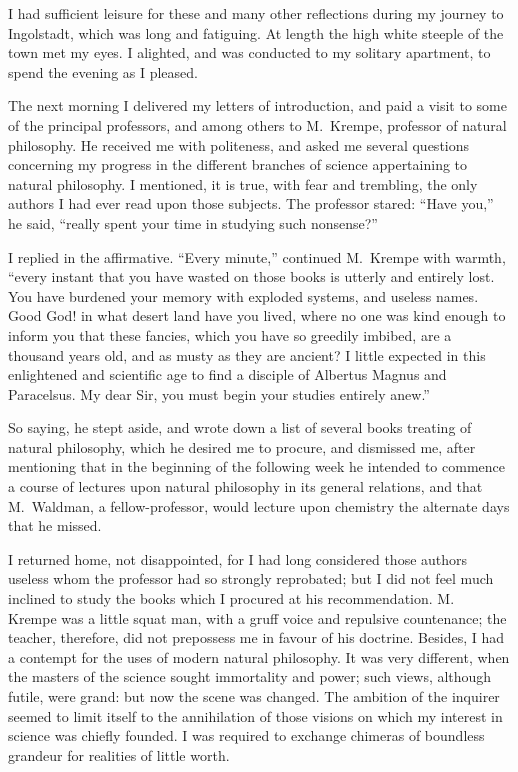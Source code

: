 I had sufficient leisure for these and
many other reflections during my journey
to Ingolstadt, which was long and
fatiguing. At length the high white
steeple of the town met my eyes. I
alighted, and was conducted to my solitary
apartment, to spend the evening
as I pleased.

The next morning I delivered my
letters of introduction, and paid a visit
to some of the principal professors, and
among others to M.~Krempe, professor
of natural philosophy. He received
me with politeness, and asked me several
questions concerning my progress
in the different branches of science
appertaining to natural philosophy. I
mentioned, it is true, with fear and
trembling, the only authors I had ever
read upon those subjects. The professor
stared: ``Have you,'' he said,
``really spent your time in studying
such nonsense?''

I replied in the affirmative. ``Every
minute,'' continued M.~Krempe with
warmth, ``every instant that you have
wasted on those books is utterly and
entirely lost. You have burdened your
memory with exploded systems, and
useless names. Good God! in what
desert land have you lived, where no
one was kind enough to inform you
that these fancies, which you have so
greedily imbibed, are a thousand years
old, and as musty as they are ancient?
I little expected in this enlightened and
scientific age to find a disciple of Albertus
Magnus and Paracelsus. My
dear Sir, you must begin your studies
entirely anew.''

So saying, he stept aside, and wrote
down a list of several books treating of
natural philosophy, which he desired
me to procure, and dismissed me, after
mentioning that in the beginning of
the following week he intended to commence
a course of lectures upon natural
philosophy in its general relations, and
that M.~Waldman, a fellow-professor,
would lecture upon chemistry the alternate
days that he missed.

I returned home, not disappointed,
for I had long considered those authors
useless whom the professor had so
strongly reprobated; but I did not feel
much inclined to study the books which
I procured at his recommendation. M.~%
Krempe was a little squat man, with a
gruff voice and repulsive countenance;
the teacher, therefore, did not prepossess
me in favour of his doctrine. Besides,
I had a contempt for the uses of modern
natural philosophy. It was very different,
when the masters of the science
sought immortality and power; such
views, although futile, were grand: but
now the scene was changed. The ambition
of the inquirer seemed to limit
itself to the annihilation of those visions
on which my interest in science was
chiefly founded. I was required to
exchange chimeras of boundless grandeur
for realities of little worth.

